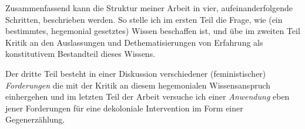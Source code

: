 Zusammenfassend kann die Struktur meiner Arbeit in vier, aufeinanderfolgende
Schritten, beschrieben werden. So stelle ich im ersten Teil die Frage, wie (ein
bestimmtes, hegemonial gesetztes) Wissen beschaffen ist, und übe im zweiten
Teil Kritik an den Auslassungen und Dethematisierungen von Erfahrung als
konstitutivem Bestandteil dieses Wissens.

Der dritte Teil besteht in einer Diskussion verschiedener (feministischer)
\textit{Forderungen} die mit der Kritik an diesem hegemonialen Wissensanspruch
einhergehen und im letzten Teil der Arbeit versuche ich einer
\textit{Anwendung} eben
jener Forderungen für eine dekoloniale Intervention im Form einer
Gegenerzählung.

